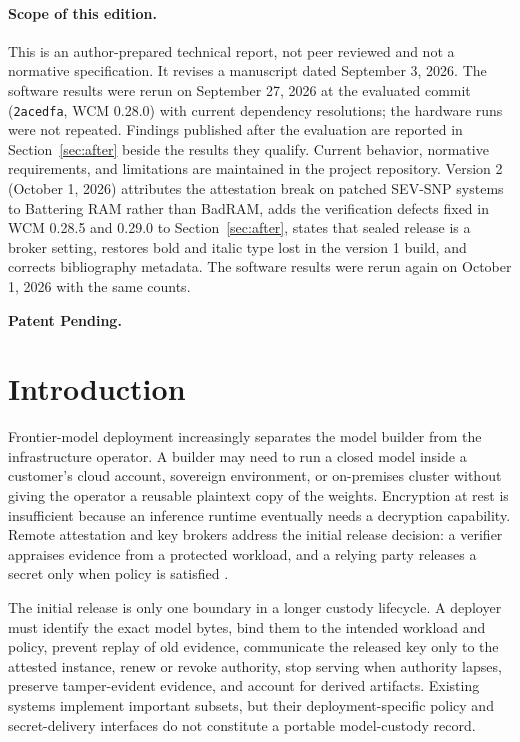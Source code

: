 \documentclass[10pt,letterpaper]{article}
\begin{document}
\paragraph{Scope of this edition.}
This is an author-prepared technical report, not peer reviewed and not a
normative specification. It revises a manuscript dated September 3, 2026. The
software results were rerun on September 27, 2026 at the evaluated commit
(\texttt{2acedfa}, WCM 0.28.0) with current dependency resolutions; the hardware
runs were not repeated. Findings published after the evaluation are reported in
Section~\ref{sec:after} beside the results they qualify. Current behavior,
normative requirements, and limitations are maintained in the project repository.
Version 2 (October 1, 2026) attributes the attestation break on patched SEV-SNP
systems to Battering RAM rather than BadRAM, adds the verification defects fixed
in WCM 0.28.5 and 0.29.0 to Section~\ref{sec:after}, states that sealed release
is a broker setting, restores bold and italic type lost in the version 1 build,
and corrects bibliography metadata. The software results were rerun again on
October 1, 2026 with the same counts.

\noindent\textbf{Patent Pending.}

\section{Introduction}

Frontier-model deployment increasingly separates the model builder from the infrastructure operator. A builder may need to run a closed model inside a customer's cloud account, sovereign environment, or on-premises cluster without giving the operator a reusable plaintext copy of the weights. Encryption at rest is insufficient because an inference runtime eventually needs a decryption capability. Remote attestation and key brokers address the initial release decision: a verifier appraises evidence from a protected workload, and a relying party releases a secret only when policy is satisfied \citep{rats,trustee,nvidia2026}.

The initial release is only one boundary in a longer custody lifecycle. A deployer must identify the exact model bytes, bind them to the intended workload and policy, prevent replay of old evidence, communicate the released key only to the attested instance, renew or revoke authority, stop serving when authority lapses, preserve tamper-evident evidence, and account for derived artifacts. Existing systems implement important subsets, but their deployment-specific policy and secret-delivery interfaces do not constitute a portable model-custody record.
\end{document}
